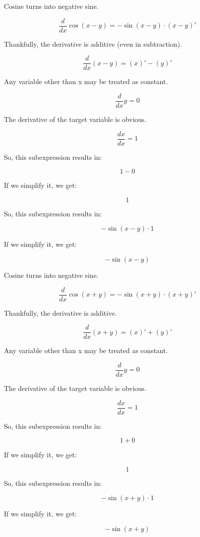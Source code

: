 \documentclass[12pt]{article}
\begin{document}
Cosine turns into negative sine.

$$ \frac{d}{dx} \cos \left( x  -  y \right) = -\sin \left( x  -  y \right) \cdot \left( x  -  y \right)' $$

Thankfully, the derivative is additive (even in subtraction).

$$ \frac{d}{dx} \left( x  -  y \right) = \left( x \right)' - \left( y \right)' $$

Any variable other than x may be treated as constant.

$$ \frac{d}{dx} y = 0 $$

The derivative of the target variable is obvious.

$$ \frac{dx}{dx} = 1 $$

So, this subexpression results in:

$$  1  -  0  $$

If we simplify it, we get:

$$  1  $$

So, this subexpression results in:

$$ - \sin \left( x  -  y \right) \cdot  1  $$

If we simplify it, we get:

$$ - \sin \left( x  -  y \right) $$

Cosine turns into negative sine.

$$ \frac{d}{dx} \cos \left( x  +  y \right) = -\sin \left( x  +  y \right) \cdot \left( x  +  y \right)' $$

Thankfully, the derivative is additive.

$$ \frac{d}{dx} \left( x  +  y \right) = \left( x \right)' + \left( y \right)' $$

Any variable other than x may be treated as constant.

$$ \frac{d}{dx} y = 0 $$

The derivative of the target variable is obvious.

$$ \frac{dx}{dx} = 1 $$

So, this subexpression results in:

$$  1  +  0  $$

If we simplify it, we get:

$$  1  $$

So, this subexpression results in:

$$ - \sin \left( x  +  y \right) \cdot  1  $$

If we simplify it, we get:

$$ - \sin \left( x  +  y \right) $$
\end{document}
